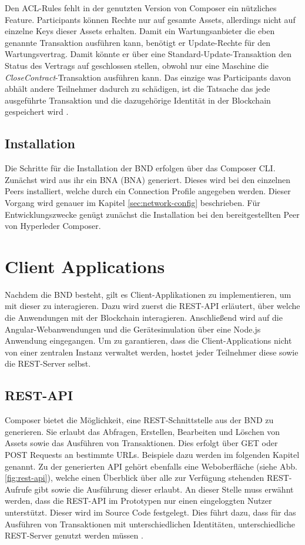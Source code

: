 Den ACL-Rules fehlt in der genutzten Version von Composer ein nützliches Feature. Participants können Rechte nur auf gesamte Assets, allerdings nicht auf einzelne Keys dieser Assets erhalten. Damit ein Wartungsanbieter die eben genannte Transaktion ausführen kann, benötigt er Update-Rechte für den Wartungsvertrag. Damit könnte er über eine Standard-Update-Transaktion den Status des Vertrags auf geschlossen stellen, obwohl nur eine Maschine die \textit{CloseContract}-Transaktion ausführen kann. Das einzige was Participants davon abhält andere Teilnehmer dadurch zu schädigen, ist die Tatsache das jede ausgeführte Transaktion und die dazugehörige Identität in der Blockchain gespeichert wird \cite{SchererPerformanceScalabilityBlockchain2017}.

\subsection{Installation}
Die Schritte für die Installation der \acs{BND} erfolgen über das Composer CLI. Zunächst wird aus ihr ein \acl{BNA} (\acs{BNA}) generiert. Dieses wird bei den einzelnen Peers installiert, welche durch ein Connection Profile angegeben werden. Dieser Vorgang wird genauer im Kapitel \ref{sec:network-config} beschrieben. Für Entwicklungszwecke genügt zunächst die Installation bei den bereitgestellten Peer von Hyperleder Composer.

\section{Client Applications}
Nachdem die \acs{BND} besteht, gilt es Client-Applikationen zu implementieren, um mit dieser zu interagieren. Dazu wird zuerst die REST-API erläutert, über welche die Anwendungen mit der Blockchain interagieren. Anschließend wird auf die Angular-Webanwendungen und die Gerätesimulation über eine Node.js Anwendung eingegangen. Um zu garantieren, dass die Client-Applications nicht von einer zentralen Instanz verwaltet werden, hostet jeder Teilnehmer diese sowie die REST-Server selbst.

\subsection{REST-API}
\label{subsec:REST}
Composer bietet die Möglichkeit, eine REST-Schnittstelle aus der \acs{BND} zu generieren. Sie erlaubt das Abfragen, Erstellen, Bearbeiten und Löschen von Assets sowie das Ausführen von Transaktionen. Dies erfolgt über GET oder POST Requests an bestimmte URLs. Beispiele dazu werden im folgenden Kapitel genannt. Zu der generierten API gehört ebenfalls eine Weboberfläche (siehe Abb. \ref{fig:rest-api}), welche einen Überblick über alle zur Verfügung stehenden REST-Aufrufe gibt sowie die Ausführung dieser erlaubt. An dieser Stelle muss erwähnt werden, dass die REST-API im Prototypen nur einen eingeloggten Nutzer unterstützt. Dieser wird im Source Code festgelegt. Dies führt dazu, dass für das Ausführen von Transaktionen mit unterschiedlichen Identitäten, unterschiedliche REST-Server genutzt werden müssen \cite{HyperledgerComposerTeamRESTAPIHyperledger}.

